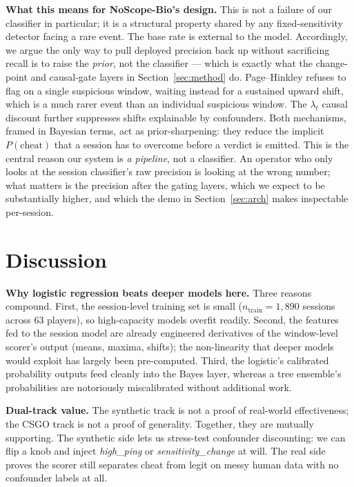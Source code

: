 \documentclass[conference,10pt]{IEEEtran}
\begin{document}
\textbf{What this means for NoScope-Bio's design.} This is not a
failure of our classifier in particular; it is a structural property
shared by any fixed-sensitivity detector facing a rare event. The base
rate is external to the model. Accordingly, we argue the only way to
pull deployed precision back up without sacrificing recall is to raise
the \emph{prior}, not the classifier --- which is exactly what the
change-point and causal-gate layers in Section~\ref{sec:method} do.
Page--Hinkley refuses to flag on a single suspicious window, waiting
instead for a sustained upward shift, which is a much rarer event than
an individual suspicious window. The $\lambda_t$ causal discount
further suppresses shifts explainable by confounders. Both
mechanisms, framed in Bayesian terms, act as prior-sharpening: they
reduce the implicit $P(\text{cheat})$ that a session has to overcome
before a verdict is emitted. This is the central reason our system is
\emph{a pipeline}, not a classifier. An operator who only looks at the
session classifier's raw precision is looking at the wrong number;
what matters is the precision after the gating layers, which we expect
to be substantially higher, and which the demo in
Section~\ref{sec:arch} makes inspectable per-session.

\section{Discussion}
\label{sec:discussion}

\textbf{Why logistic regression beats deeper models here.} Three reasons
compound. First, the session-level training set is small ($n_\text{train}
= 1{,}890$ sessions across $63$ players), so high-capacity models
overfit readily. Second, the features fed to the session model are
already engineered derivatives of the window-level scorer's output
(means, maxima, shifts); the non-linearity that deeper models would
exploit has largely been pre-computed. Third, the logistic's calibrated
probability outputs feed cleanly into the Bayes layer, whereas a tree
ensemble's probabilities are notoriously miscalibrated without
additional work.

\textbf{Dual-track value.} The synthetic track is not a proof of
real-world effectiveness; the CSGO track is not a proof of generality.
Together, they are mutually supporting. The synthetic side lets us
stress-test confounder discounting: we can flip a knob and inject
\emph{high\_ping} or \emph{sensitivity\_change} at will. The real side
proves the scorer still separates cheat from legit on messy human data
with no confounder labels at all.
\end{document}
